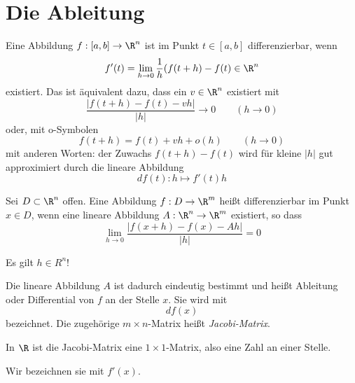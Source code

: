\documentclass{mycourse}
\begin{document}
\section{Die Ableitung}

Eine Abbildung $f:[a,b]\to\R^n$ ist im Punkt $t\in[a,b]$ differenzierbar, wenn
\[
f'(t)=\lim_{h\to 0}\frac 1h (f(t+h)-f(t) \in \R^n
\]
existiert.
Das ist äquivalent dazu, dass ein $v\in\R^n$ existiert mit
\[
\frac{|f(t+h)-f(t)-vh|}{|h|}\to 0 \qquad (h\to 0)
\]
oder, mit o-Symbolen
\[
f(t+h)=f(t)+vh+o(h) \qquad (h\to 0)
\]
mit anderen Worten: der Zuwachs $f(t+h)-f(t)$ wird für kleine $|h|$ gut approximiert durch die lineare Abbildung
\[
df(t): h\mapsto f'(t)h
\]

\begin{df}
Sei $D\subset \R^n$ offen.
Eine Abbildung $f:D\to \R^m$ heißt differenzierbar im Punkt $x\in D$, wenn eine lineare Abbildung $A:\R^n\to\R^m$ existiert, so dass 
\[
\boxed{\lim_{h\to 0}\frac {|f(x+h)-f(x)-Ah|}{|h|}=0}
\]
\begin{note}
Es gilt $h\in R^n$!
\end{note}
Die lineare Abbildung $A$ ist dadurch eindeutig bestimmt und heißt Ableitung oder Differential von $f$ an der Stelle $x$.
Sie wird mit
\[
df(x)
\]
bezeichnet.
Die zugehörige $m\times n$-Matrix heißt \emph{Jacobi-Matrix}.
\begin{note}
In $\R$ ist die Jacobi-Matrix eine $1\times 1$-Matrix, also eine Zahl an einer Stelle.
\end{note}


Wir bezeichnen sie mit $f'(x)$.
\end{df}
\end{document}
